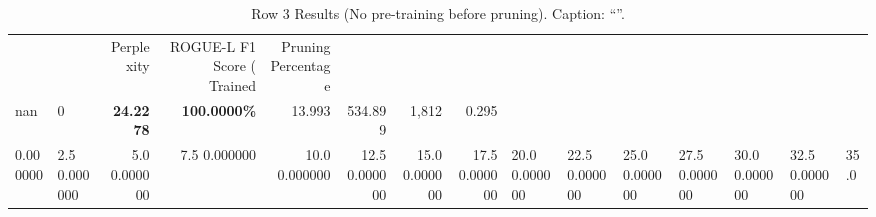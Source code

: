 \begin{table}
\caption{Row 3 Results (No pre-training before pruning). \ifshowcaption{}Caption: ``''.\fi}
\label{tab:evaluation-pipeline-3-untrained}
\begin{tabular}{llrrrrrr}
 &  & Perplexity & ROGUE-L F1 Score (%
Trained & Pruning Percentage &  &  &  &  &  &  \\
nan & 0 & \bfseries 24.2278 & \bfseries 100.0000\% & 13.993 & 534.899 & 1,812 & 0.295 \\
0.000000 & 2.5%
0.000000 & 5.0%
0.000000 & 7.5%
0.000000 & 10.0%
0.000000 & 12.5%
0.000000 & 15.0%
0.000000 & 17.5%
0.000000 & 20.0%
0.000000 & 22.5%
0.000000 & 25.0%
0.000000 & 27.5%
0.000000 & 30.0%
0.000000 & 32.5%
0.000000 & 35.0%

\end{tabular}
\end{table}
